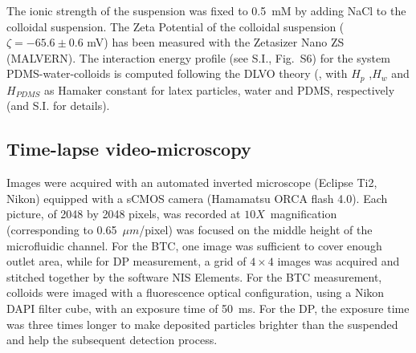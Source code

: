 \documentclass[singlecolumn,pre,notitlepage,preprintnumbers,floatfix,superscriptaddress]{revtex4-1}
\begin{document}
\noindent
The ionic strength of the suspension was fixed to 0.5~mM by adding NaCl to the colloidal suspension. The Zeta Potential of the colloidal suspension ($\zeta = -65.6 \pm 0.6$ mV) has been measured with the Zetasizer Nano ZS (MALVERN). The interaction energy profile (see S.I., Fig.~S6) for the system PDMS-water-colloids is computed following the DLVO theory (\cite{ruckenstein_adsorption_1976, Hogg1966,Elimbook}, with $H_p$ ,$H_w$ and $H_{PDMS}$ as Hamaker constant for latex particles, water and PDMS, respectively (\cite{ruckenstein_adsorption_1976, Hogg1966,yu_evaporative_2017}and S.I. for details).

\subsection*{Time-lapse video-microscopy}
\noindent
Images were acquired with an automated inverted microscope (Eclipse Ti2, Nikon) equipped with a sCMOS camera (Hamamatsu ORCA flash 4.0). Each picture, of 2048 by 2048 pixels, was recorded at $10X$~magnification (corresponding to 0.65~$\mu m$/pixel) was focused on the middle height of the microfluidic channel. For the BTC, one image was sufficient to cover enough outlet area, while for DP measurement, a grid of $4 \times 4$ images was acquired and stitched together by the software NIS Elements. For the BTC measurement, colloids were imaged with a fluorescence optical configuration, using a Nikon DAPI filter cube, with an exposure time of 50~ms. For the DP, the exposure time was three times longer to make deposited particles brighter than the suspended and help the subsequent detection process.\\
\end{document}
